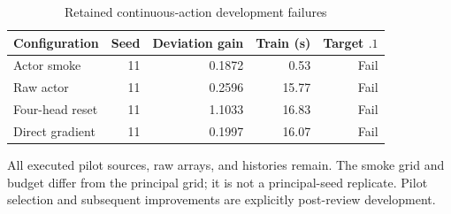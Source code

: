 \begin{table}[htbp]\centering
\caption{Retained continuous-action development failures}
\begin{small}\begin{tabular}{lrrrr}
\toprule
Configuration & Seed & Deviation gain & Train (s) & Target $.1$ \\
\midrule
Actor smoke & 11 & 0.1872 & 0.53 & Fail \\
Raw actor & 11 & 0.2596 & 15.77 & Fail \\
Four-head reset & 11 & 1.1033 & 16.83 & Fail \\
Direct gradient & 11 & 0.1997 & 16.07 & Fail \\
\bottomrule\end{tabular}\end{small}
\par\smallskip\begin{minipage}{.96\linewidth}\footnotesize All executed pilot sources, raw arrays, and histories remain. The smoke grid and budget differ from the principal grid; it is not a principal-seed replicate. Pilot selection and subsequent improvements are explicitly post-review development.\end{minipage}
\end{table}
